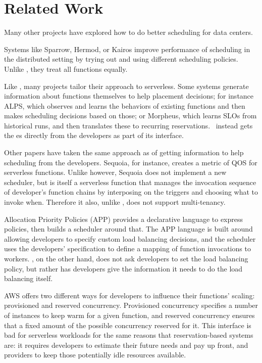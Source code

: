 \section{Related Work}

Many other projects have explored how to do better scheduling for data centers.
 
Systems like Sparrow\cite{sparrow}, Hermod\cite{hermod}, or Kairos\cite{kairos}
improve performance of scheduling in the distributed setting by trying out and
using different scheduling policies. Unlike \sys{}, they treat all functions
equally.

Like \sys{}, many projects tailor their approach to serverless. Some systems
generate information about functions themselves to help placement decisions; for
instance ALPS\cite{alps}, which observes and learns the behaviors of existing
functions and then makes scheduling decisions based on those; or
Morpheus\cite{morpheus}, which learns SLOs from historical runs, and then
translates these to recurring reservations.~\Sys{} instead gets the \class{}es
directly from the developers as part of its interface.

Other papers have taken the same approach as \sys{} of getting information to
help scheduling from the developers. Sequoia\cite{sequoia}, for instance,
creates a metric of QOS for serverless functions. Unlike \sys{} however, Sequoia
does not implement a new scheduler, but is itself a serverless function that
manages the invocation sequence of developer's function chains by interposing on
the triggers and choosing what to invoke when. Therefore it also, unlike
\sys{}, does not support multi-tenancy.

Allocation Priority Policies (APP)\cite{app-paper} provides a declarative
language to express policies, then builds a scheduler around that. The APP
language is built around allowing developers to specify custom load balancing
decisions, and the scheduler uses the developers' specification to define a
mapping of function invocations to workers. \Sys{}, on the other hand, does not
ask developers to set the load balancing policy, but rather has developers give
\sys{} the information it needs to do the load balancing itself.

AWS offers two different ways for developers to influence their functions'
scaling: provisioned and reserved concurrency\cite{aws-scaling}. Provisioned
concurrency specifies a number of instances to keep warm for a given function,
and reserved concurrency ensures that a fixed amount of the possible concurrency
reserved for it. This interface is bad for serverless workloads for the same
reasons that reservation-based systems are: it requires developers to estimate
their future needs and pay up front, and providers to keep those potentially
idle resources available.

